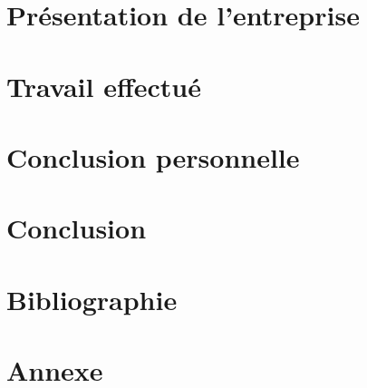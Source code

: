 \documentclass[a4paper,12pt]{article}
\begin{document}
\section{Présentation de l'entreprise}

\newpage{}

\section{Travail effectué}

\newpage{}

\section{Conclusion personnelle}

\newpage{}

\section{Conclusion}

\newpage{}

\section{Bibliographie}

\newpage{}

\section{Annexe}

\newpage{}


\newpage{}
\end{document}
